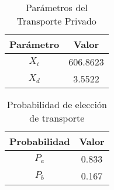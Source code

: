 \begin{table}[H]
    \centering
    \caption{Parámetros del Transporte Privado}
    \begin{tabular}{|c|c|}
    \hline
    Parámetro & Valor  \\ \hline
    $X_i$    & 606.8623     \\ \hline
    $X_{d}$    & 3.5522     \\ \hline
    \end{tabular}
    \label{tab:param_transporte}
\end{table}

\begin{table}[H]
    \centering
    \caption{Probabilidad de elección de transporte}
    \begin{tabular}{|c|c|}
    \hline
    Probabilidad & Valor  \\ \hline
    $P_{a}$    & 0.833    \\ \hline
    $P_{b}$    & 0.167     \\ \hline
    \end{tabular}
    \label{tab:prob}
\end{table}

